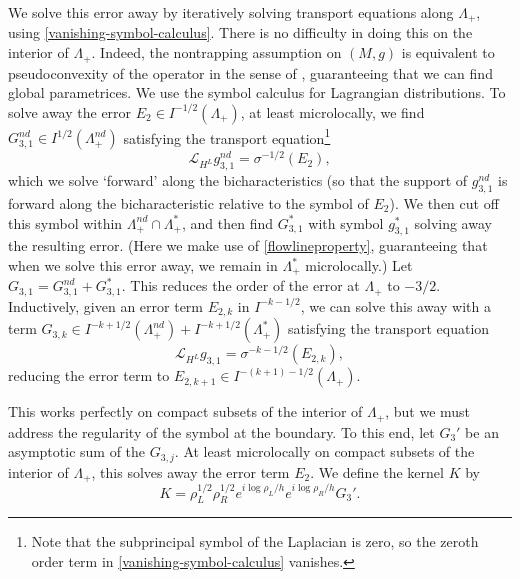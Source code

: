 \documentclass[10pt, a4paper, twoside]{amsart}
\numberwithin{equation}{section}
\theoremstyle{remark}
\begin{document}
We solve this error away by iteratively solving transport equations along $\Lambda_+$, using \eqref{vanishing-symbol-calculus}. There is no difficulty in doing this on the interior of $\Lambda_+$. Indeed, the nontrapping assumption on $(M, g)$ is equivalent to pseudoconvexity of the operator in the sense of \cite[Section 6.5]{Duistermaat-Hormander-Acta-1972}, guaranteeing that we can find global parametrices. We use the symbol calculus for Lagrangian distributions. To solve away the error $E_2 \in I^{-1/2}(\Lambda_+)$, at least microlocally, we find $G_{3, 1}^{nd} \in I^{1/2}(\Lambda_+^{nd})$ satisfying the transport equation\footnote{Note that the subprincipal symbol of the Laplacian is zero, so the zeroth order term in \eqref{vanishing-symbol-calculus} vanishes.}
\begin{equation*}
\mathcal{L}_{H^L} g_{3,1}^{nd}  = \sigma^{-1/2}(E_2),
\end{equation*}
which we solve `forward' along the bicharacteristics (so that the support of $g_{3,1}^{nd}$ is forward along the bicharacteristic relative to the symbol of $E_2$).  We then cut off this symbol within $\Lambda_+^{nd} \cap \Lambda_+^*$, and then find $G_{3,1}^*$ with symbol $g_{3,1}^*$ solving away the resulting error. (Here we make use of \eqref{flowlineproperty}, guaranteeing that when we solve this error away, we remain in $\Lambda_+^*$ microlocally.) Let $G_{3,1} = G_{3,1}^{nd} + G_{3,1}^*$. 
This reduces the order of the error at $\Lambda_+$ to $-3/2$. Inductively, given an error term $E_{2, k}$ in $I^{-k-1/2}$, we can solve this away with a term $G_{3, k} \in I^{-k+1/2}(\Lambda_+^{nd}) + I^{-k+1/2}(\Lambda_+^*)$ satisfying the transport equation
\begin{equation}
\mathcal{L}_{H^L} g_{3,1}  = \sigma^{-k-1/2}(E_{2,k}),
\label{trl}\end{equation}
reducing the error term to $E_{2, k+1} \in I^{-(k+1) - 1/2}(\Lambda_+)$. 

This works perfectly on compact subsets of the interior of $\Lambda_+$, but we must address the regularity of the symbol at the boundary. To this end, let $G_3'$ be an asymptotic sum of the $G_{3, j}$.
At least microlocally on compact subsets of the interior of $\Lambda_+$, this solves away the error term $E_2$. 
We define the kernel  $K$ by 
\begin{equation}
K = \rho_L^{1/2} \rho_R^{1/2}  e^{i \log \rho_L/h } e^{i \log \rho_R/h } G_3'.
\label{Kdefn}\end{equation}

 
\end{document}
